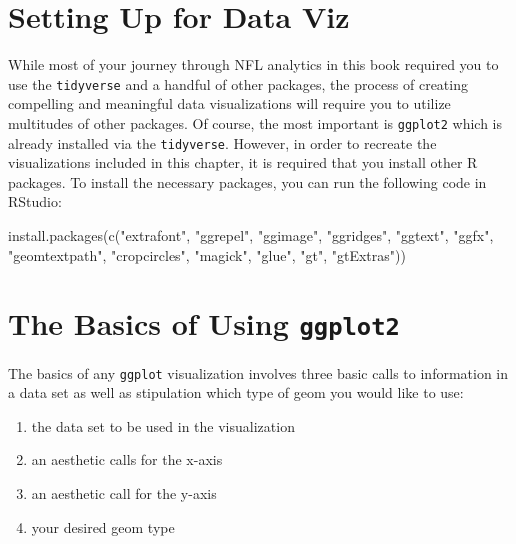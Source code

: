 \documentclass[
  letterpaper,
]{krantz}
\newenvironment{Shaded}{\begin{snugshade}}{\end{snugshade}}
\newcommand{\FunctionTok}[1]{\textcolor[rgb]{0.28,0.35,0.67}{#1}}
\newcommand{\NormalTok}[1]{\textcolor[rgb]{0.00,0.23,0.31}{#1}}
\newcommand{\StringTok}[1]{\textcolor[rgb]{0.13,0.47,0.30}{#1}}
\providecommand{\tightlist}{%
  \setlength{\itemsep}{0pt}\setlength{\parskip}{0pt}}\usepackage{longtable,booktabs,array}
\begin{document}
\hypertarget{setting-up-for-data-viz}{%
\section{Setting Up for Data Viz}\label{setting-up-for-data-viz}}

While most of your journey through NFL analytics in this book required
you to use the \texttt{tidyverse} and a handful of other packages, the
process of creating compelling and meaningful data visualizations will
require you to utilize multitudes of other packages. Of course, the most
important is \texttt{ggplot2} which is already installed via the
\texttt{tidyverse}. However, in order to recreate the visualizations
included in this chapter, it is required that you install other R
packages. To install the necessary packages, you can run the following
code in RStudio:

\begin{Shaded}
\begin{Highlighting}[]
\FunctionTok{install.packages}\NormalTok{(}\FunctionTok{c}\NormalTok{(}\StringTok{"extrafont"}\NormalTok{,}
                   \StringTok{"ggrepel"}\NormalTok{,}
                   \StringTok{"ggimage"}\NormalTok{,}
                   \StringTok{"ggridges"}\NormalTok{,}
                   \StringTok{"ggtext"}\NormalTok{,}
                   \StringTok{"ggfx"}\NormalTok{,}
                   \StringTok{"geomtextpath"}\NormalTok{,}
                   \StringTok{"cropcircles"}\NormalTok{,}
                   \StringTok{"magick"}\NormalTok{,}
                   \StringTok{"glue"}\NormalTok{,}
                   \StringTok{"gt"}\NormalTok{,}
                   \StringTok{"gtExtras"}\NormalTok{))}
\end{Highlighting}
\end{Shaded}

\hypertarget{the-basics-of-using-ggplot2}{%
\section{\texorpdfstring{The Basics of Using
\texttt{ggplot2}}{The Basics of Using ggplot2}}\label{the-basics-of-using-ggplot2}}

The basics of any \texttt{ggplot} visualization involves three basic
calls to information in a data set as well as stipulation which type of
geom you would like to use:

\begin{enumerate}
\def\labelenumi{\arabic{enumi}.}
\tightlist
\item
  the data set to be used in the visualization
\item
  an aesthetic calls for the x-axis
\item
  an aesthetic call for the y-axis
\item
  your desired geom type
\end{enumerate}
\end{document}
